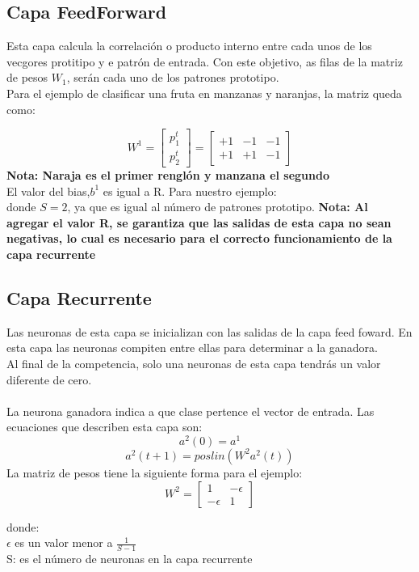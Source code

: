 \documentclass{article}
\begin{document}
\subsection{Capa FeedForward}
Esta capa calcula la correlación o producto interno entre cada unos de los vecgores protitipo y e patrón de entrada. Con este objetivo, as filas de la matriz de pesos $W_1$, serán cada uno de los patrones prototipo.\\
Para el ejemplo de clasificar una fruta en manzanas y naranjas, la matriz queda como:

\[
W^1 = 
\begin{bmatrix}
	p_1^t\\
	p_2^t
\end{bmatrix}
=
\begin{bmatrix}
+1 & -1 &- 1 \\
+1 & +1 & -1
\end{bmatrix}
\]
\textbf{Nota: Naraja es el primer renglón y manzana el segundo}\\
El valor del bias,$b^1$ es igual a R. Para nuestro ejemplo:\\
donde $S = 2$, ya que es igual al número de patrones prototipo. \textbf{Nota: Al agregar el valor R, se garantiza que las salidas de esta capa no sean negativas, lo cual es necesario para el correcto funcionamiento de la capa recurrente}

\subsection{Capa Recurrente}
Las neuronas de esta capa se inicializan con las salidas de la capa feed foward. En esta capa las neuronas compiten entre ellas para determinar a la ganadora.\\ Al final de la competencia, solo una neuronas de esta capa tendrás un valor diferente de cero.\\\\
La neurona ganadora indica a que clase pertence el vector de entrada. Las ecuaciones que describen esta capa son:
$$ a^2(0) = a^1$$
$$ a^2(t + 1) = poslin(W^2a^2(t)) $$
La matriz de pesos tiene la siguiente forma para el ejemplo:
\[
W^2 = 
\begin{bmatrix}
1 & - \epsilon\\
-\epsilon & 1
\end{bmatrix}
\]

donde:\\
$\epsilon$ es un valor menor a $\frac{1}{S - 1}$\\
S: es el número de neuronas en la capa recurrente\\
\end{document}

